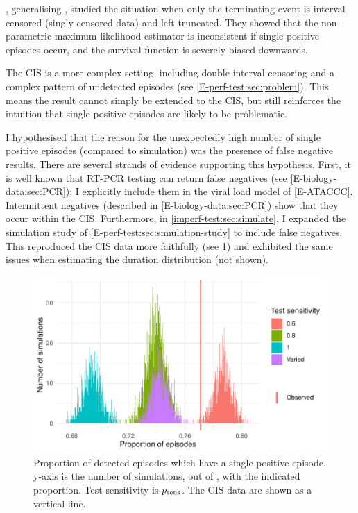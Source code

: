 \documentclass[thesis.tex]{subfiles}
\begin{document}
\Textcite{shenNonparametrica}, generalising \textcite{panNote}, studied the situation when only the terminating event is interval censored (\ie singly censored data) and left truncated.
They showed that the non-parametric maximum likelihood estimator is inconsistent if single positive episodes occur, and the survival function is severely biased downwards.

The CIS is a more complex setting, including double interval censoring and a complex pattern of undetected episodes (see \cref{E-perf-test:sec:problem}).
This means the result cannot simply be extended to the CIS, but still reinforces the intuition that single positive episodes are likely to be problematic.

I hypothesised that the reason for the unexpectedly high number of single positive episodes (compared to simulation) was the presence of false negative results.
There are several strands of evidence supporting this hypothesis.
First, it is well known that RT-PCR testing can return false negatives  (see \cref{E-biology-data:sec:PCR}); I explicitly include them in the viral load model of \cref{E-ATACCC}.
Intermittent negatives (described in  \cref{E-biology-data:sec:PCR}) show that they occur within the CIS.
Furthermore, in \cref{imperf-test:sec:simulate}, I expanded the simulation study of \cref{E-perf-test:sec:simulation-study} to include false negatives.
This reproduced the CIS data more faithfully (see \cref{imperf-test:fig:sim-single-pos}) and exhibited the same issues when estimating the duration distribution (not shown).
\begin{figure}
  \centering \includegraphics{cis-imperfect-testing/sim-single-positive-episodes}
  \caption[Single positive episodes in CIS simulation]{%
    Proportion of detected episodes which have a single positive episode.
    y-axis is the number of simulations, out of , with the indicated proportion.
    Test sensitivity is $p_\text{sens}$.
    The CIS data are shown as a vertical line.
  }
  \label{imperf-test:fig:sim-single-pos}
\end{figure}
\end{document}
